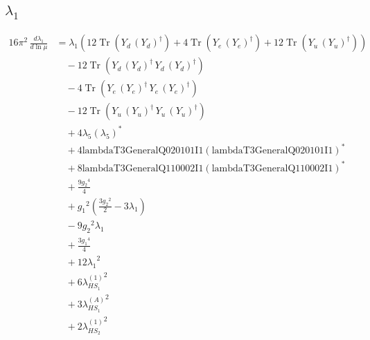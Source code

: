 \documentclass[10pt,a4paper]{article}
\begin{document}
\subsection*{$\lambda_1$}
\begin{align*}
16\pi^2\,\frac{d \lambda_1}{d\ln\mu} &={\lambda_1} (12 \operatorname{Tr}\!\left({Y_d}\,\left({Y_d}\right)^{\dagger}\right)+4 \operatorname{Tr}\!\left({Y_e}\,\left({Y_e}\right)^{\dagger}\right)+12 \operatorname{Tr}\!\left({Y_u}\,\left({Y_u}\right)^{\dagger}\right)) \\
&\quad -12 \operatorname{Tr}\!\left({Y_d}\,\left({Y_d}\right)^{\dagger}\,{Y_d}\,\left({Y_d}\right)^{\dagger}\right) \\
&\quad -4 \operatorname{Tr}\!\left({Y_e}\,\left({Y_e}\right)^{\dagger}\,{Y_e}\,\left({Y_e}\right)^{\dagger}\right) \\
&\quad -12 \operatorname{Tr}\!\left({Y_u}\,\left({Y_u}\right)^{\dagger}\,{Y_u}\,\left({Y_u}\right)^{\dagger}\right) \\
&\quad +4 {\lambda_5} \left({\lambda_5}\right)^{*} \\
&\quad +4 \text{lambdaT3GeneralQ020101I1} \left(\text{lambdaT3GeneralQ020101I1}\right)^{*} \\
&\quad +8 \text{lambdaT3GeneralQ110002I1} \left(\text{lambdaT3GeneralQ110002I1}\right)^{*} \\
&\quad +\frac{9 {g_2}^4}{4} \\
&\quad +{g_1}^2 \left(\frac{3 {g_2}^2}{2}-3 {\lambda_1}\right) \\
&\quad -9 {g_2}^2 {\lambda_1} \\
&\quad +\frac{3 {g_1}^4}{4} \\
&\quad +12 {\lambda_1}^2 \\
&\quad +6 {\lambda_{HS_1}^{(1)}}^2 \\
&\quad +3 {\lambda_{HS_1}^{(A)}}^2 \\
&\quad +2 {\lambda_{HS_2}^{(1)}}^2 \\
\end{align*}
\end{document}

